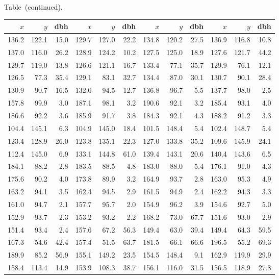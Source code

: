 \documentclass[draft]{article}
\begin{document}
\scriptsize
\begin{center}
{\normalsize Table~\thetable (continued).}
\par\vspace{\baselineskip}\par
\begin{tabular}{rrrrrrrrrrrr}
\hline
\(x\)&\(y\)& dbh &\(x\)&\(y\)& dbh &\(x\)&\(y\)& dbh &\(x\)&\(y\)& dbh \\
\hline
136.2&122.1& 15.0&129.7&127.0& 22.2&134.8&120.2& 27.5&136.9&116.8& 10.8\\
137.0&116.0& 26.2&128.9&124.2& 10.2&127.5&125.0& 18.9&127.6&121.7& 44.2\\
129.7&119.0& 13.8&126.6&121.1& 16.7&133.4& 77.1& 35.7&129.9& 76.1& 12.1\\
126.5& 77.3& 35.4&129.1& 83.1& 32.7&134.4& 87.0& 30.1&130.7& 90.1& 28.4\\
130.9& 90.7& 16.5&132.0& 94.5& 12.7&136.8& 96.7&  5.5&137.7& 98.0&  2.5\\
157.8& 99.9&  3.0&187.1& 98.1&  3.2&190.6& 92.1&  3.2&185.4& 93.1&  4.0\\
186.6& 92.2&  3.6&185.9& 91.7&  3.8&184.3& 92.1&  4.3&188.2& 91.2&  3.3\\
104.4&145.1&  6.3&104.9&145.0& 18.4&101.5&148.4&  5.4&102.4&148.7&  5.4\\
123.4&128.9& 26.0&123.8&135.1& 22.3&127.0&133.8& 35.2&109.6&145.9& 24.1\\
112.4&145.0&  6.9&133.1&144.8& 61.0&139.4&143.1& 20.6&140.4&143.6&  6.5\\
184.1& 88.2&  2.8&183.5& 88.5&  4.8&183.0& 88.0&  5.4&176.1& 91.0&  4.3\\
175.6& 90.2&  4.0&173.8& 89.9&  3.2&164.9& 93.7&  2.8&163.0& 95.3&  4.9\\
163.2& 94.1&  3.5&162.4& 94.5&  2.9&161.5& 94.9&  2.4&162.2& 94.3&  3.3\\
161.0& 94.7&  2.1&157.7& 95.7&  2.0&154.9& 96.2&  3.9&154.6& 92.7&  5.0\\
152.9& 93.7&  2.3&153.2& 93.2&  2.2&168.2& 73.0& 67.7&151.6& 93.0&  2.9\\
151.4& 93.4&  2.4&157.6& 67.2& 56.3&149.4& 63.0& 39.4&149.4& 64.3& 59.5\\
167.3& 54.6& 42.4&157.4& 51.5& 63.7&181.5& 66.1& 66.6&196.5& 55.2& 69.3\\
189.9& 85.2& 56.9&155.1&149.2& 23.5&154.5&148.4&  9.1&162.9&119.9& 29.9\\
158.4&113.4& 14.9&153.9&108.3& 38.7&156.1&116.0& 31.5&156.5&118.9& 27.8\\

\end{tabular}
\end{center}
\end{document}
